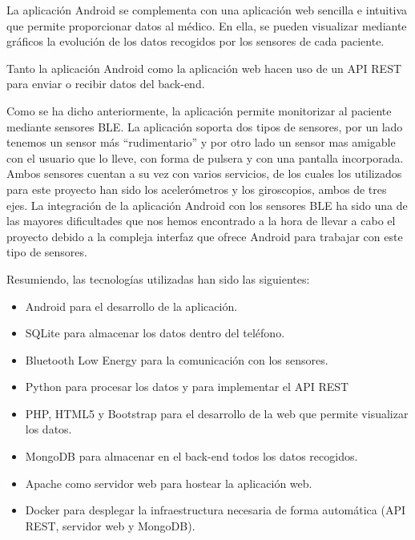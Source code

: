 \documentclass[11pt,spanish]{article}
\begin{document}
La aplicación Android se complementa con una aplicación web sencilla e intuitiva que permite proporcionar datos al médico. En ella, se pueden visualizar mediante gráficos la evolución de los datos recogidos por los sensores de cada paciente.
\newline

Tanto la aplicación Android como la aplicación web hacen uso de un API REST para enviar o recibir datos del back-end.
\newline

Como se ha dicho anteriormente, la aplicación permite monitorizar al paciente mediante sensores BLE. La aplicación soporta dos tipos de sensores, por un lado tenemos un sensor más “rudimentario” y por otro lado un sensor mas amigable con el usuario que lo lleve, con forma de pulsera y con una pantalla incorporada. Ambos sensores cuentan a su vez con varios servicios, de los cuales los utilizados para este proyecto han sido los acelerómetros y los giroscopios, ambos de tres ejes. La integración de la aplicación Android con los sensores BLE ha sido una de las mayores dificultades que nos hemos encontrado a la hora de llevar a cabo el proyecto debido a la compleja interfaz que ofrece Android para trabajar con este tipo de sensores.
\newline

Resumiendo, las tecnologías utilizadas han sido las siguientes:

\begin{itemize}
    \item Android para el desarrollo de la aplicación. 
	\item SQLite para almacenar los datos dentro del teléfono. 
	\item Bluetooth Low Energy para la comunicación con los sensores. 
	\item Python para procesar los datos y para implementar el API REST
    \item PHP, HTML5 y Bootstrap para el desarrollo de la web que permite visualizar los datos.
	\item MongoDB para almacenar en el back-end todos los datos recogidos.
    \item Apache como servidor web para hostear la aplicación web.
    \item Docker para desplegar la infraestructura necesaria de forma automática (API REST, servidor web y MongoDB).  
    \newline
\end{itemize}
\end{document}

